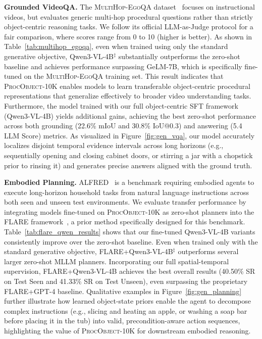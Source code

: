 \textbf{Grounded VideoQA.}
The \textsc{MultiHop-EgoQA} dataset~\cite{chen2025grounded} focuses on instructional videos, but evaluates generic multi-hop procedural questions rather than strictly object-centric reasoning tasks. We follow its official LLM-as-Judge protocol for a fair comparison, where scores range from 0 to 10 (higher is better). As shown in Table~\ref{tab:multihop_egoqa}, even when trained using only the standard generative objective, Qwen3-VL-4B$^\ddagger$ substantially outperforms the zero-shot baseline and achieves performance surpassing GeLM-7B, which is specifically fine-tuned on the \textsc{MultiHop-EgoQA} training set. This result indicates that \textsc{ProcObject-10K} enables models to learn transferable object-centric procedural representations that generalize effectively to broader video understanding tasks. Furthermore, the model trained with our full object-centric SFT framework (Qwen3-VL-4B) yields additional gains, achieving the best zero-shot performance across both grounding (22.6\% mIoU and 30.8\% IoU@0.3) and answering (5.4 LLM Score) metrics. As visualized in Figure~\ref{fig:gen_vqa}, our model accurately localizes disjoint temporal evidence intervals across long horizons (e.g., sequentially opening and closing cabinet doors, or stirring a jar with a chopstick prior to rinsing it) and generates precise answers aligned with the ground truth.

\textbf{Embodied Planning.}
ALFRED~\cite{ALFRED20} is a benchmark requiring embodied agents to execute long-horizon household tasks from natural language instructions across both seen and unseen test environments. We evaluate transfer performance by integrating models fine-tuned on \textsc{ProcObject-10K} as zero-shot planners into the FLARE framework~\cite{kim2025multimodal}, a prior method specifically designed for this benchmark. Table~\ref{tab:flare_qwen_results} shows that our fine-tuned Qwen3-VL-4B variants consistently improve over the zero-shot baseline. Even when trained only with the standard generative objective, FLARE+Qwen3-VL-4B$^\ddagger$ outperforms several larger zero-shot MLLM planners. Incorporating our full spatial-temporal supervision, FLARE+Qwen3-VL-4B achieves the best overall results (40.50\% SR on Test Seen and 41.33\% SR on Test Unseen), even surpassing the proprietary FLARE+GPT-4 baseline. Qualitative examples in Figure~\ref{fig:gen_planning} further illustrate how learned object-state priors enable the agent to decompose complex instructions (e.g., slicing and heating an apple, or washing a soap bar before placing it in the tub) into valid, precondition-aware action sequences, highlighting the value of \textsc{ProcObject-10K} for downstream embodied reasoning.